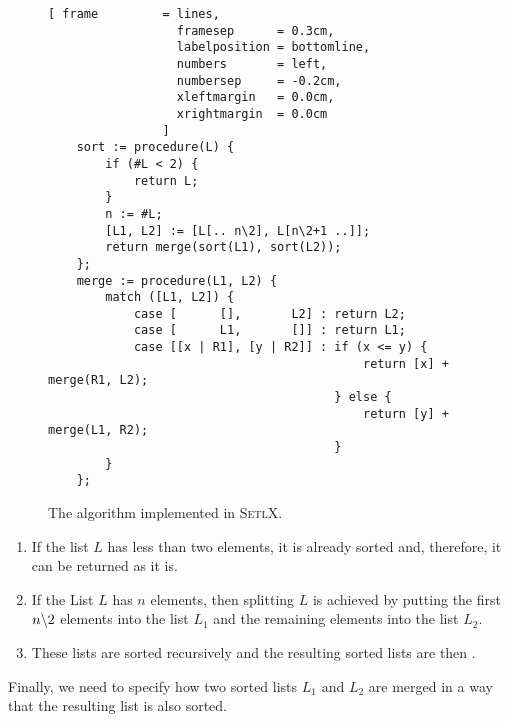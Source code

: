 \begin{figure}[!ht]
  \centering
\begin{Verbatim}[ frame         = lines, 
                  framesep      = 0.3cm, 
                  labelposition = bottomline,
                  numbers       = left,
                  numbersep     = -0.2cm,
                  xleftmargin   = 0.0cm,
                  xrightmargin  = 0.0cm
                ]
    sort := procedure(L) {
        if (#L < 2) {
            return L;
        }
        n := #L;
        [L1, L2] := [L[.. n\2], L[n\2+1 ..]];
        return merge(sort(L1), sort(L2));
    };
    merge := procedure(L1, L2) {
        match ([L1, L2]) {
            case [      [],       L2] : return L2;
            case [      L1,       []] : return L1;
            case [[x | R1], [y | R2]] : if (x <= y) {
                                            return [x] + merge(R1, L2);
                                        } else {
                                            return [y] + merge(L1, R2);
                                        }
        }
    };
\end{Verbatim}
\vspace*{-0.3cm}
  \caption{The  algorithm implemented in \textsc{SetlX}.}
  \label{fig:merge-sort.stlx}
\end{figure}
\begin{enumerate}
\item If the list $L$ has less than two elements, it is already sorted and, therefore, it
      can be returned as it is.
\item If the List $L$ has $n$ elements, then splitting $L$ is achieved by putting the first $n\symbol{92}2$
      elements into the list $L_1$ and the remaining elements into the list $L_2$.
\item These lists are sorted recursively and the resulting sorted lists are then .
\end{enumerate}
Finally, we need to specify how two sorted lists $L_1$ and $L_2$ are merged in a way that the resulting list
is also sorted.
